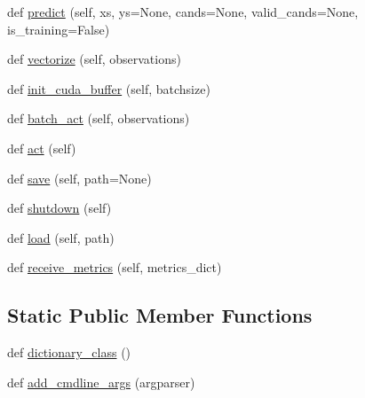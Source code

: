 \begin{DoxyCompactItemize}
\item 
def \hyperlink{classparlai_1_1agents_1_1legacy__agents_1_1seq2seq_1_1seq2seq__v0_1_1Seq2seqAgent_aadec879f7d8daa6451076e4fb358715b}{predict} (self, xs, ys=None, cands=None, valid\+\_\+cands=None, is\+\_\+training=False)
\item 
def \hyperlink{classparlai_1_1agents_1_1legacy__agents_1_1seq2seq_1_1seq2seq__v0_1_1Seq2seqAgent_a83e2433e00bff6162ebad3b818771b59}{vectorize} (self, observations)
\item 
def \hyperlink{classparlai_1_1agents_1_1legacy__agents_1_1seq2seq_1_1seq2seq__v0_1_1Seq2seqAgent_a9326d8ed88999a992b8ec73313c70a36}{init\+\_\+cuda\+\_\+buffer} (self, batchsize)
\item 
def \hyperlink{classparlai_1_1agents_1_1legacy__agents_1_1seq2seq_1_1seq2seq__v0_1_1Seq2seqAgent_a4ae534e440fd57603bc9b6e7c08b1c57}{batch\+\_\+act} (self, observations)
\item 
def \hyperlink{classparlai_1_1agents_1_1legacy__agents_1_1seq2seq_1_1seq2seq__v0_1_1Seq2seqAgent_ae66e8065addb136eb82828ccbe56c5ca}{act} (self)
\item 
def \hyperlink{classparlai_1_1agents_1_1legacy__agents_1_1seq2seq_1_1seq2seq__v0_1_1Seq2seqAgent_a31c017cd07b01834a5d467fadfddd7cd}{save} (self, path=None)
\item 
def \hyperlink{classparlai_1_1agents_1_1legacy__agents_1_1seq2seq_1_1seq2seq__v0_1_1Seq2seqAgent_a86c41e705170f0b2e56a5bbc378aead9}{shutdown} (self)
\item 
def \hyperlink{classparlai_1_1agents_1_1legacy__agents_1_1seq2seq_1_1seq2seq__v0_1_1Seq2seqAgent_a2aabe1e56b7b94f46875ae7f704f681f}{load} (self, path)
\item 
def \hyperlink{classparlai_1_1agents_1_1legacy__agents_1_1seq2seq_1_1seq2seq__v0_1_1Seq2seqAgent_a584d45d729817694d615d2d545532af2}{receive\+\_\+metrics} (self, metrics\+\_\+dict)
\end{DoxyCompactItemize}
\subsection*{Static Public Member Functions}
\begin{DoxyCompactItemize}
\item 
def \hyperlink{classparlai_1_1agents_1_1legacy__agents_1_1seq2seq_1_1seq2seq__v0_1_1Seq2seqAgent_a05552a2714cd8d15d754a62258727c98}{dictionary\+\_\+class} ()
\item 
def \hyperlink{classparlai_1_1agents_1_1legacy__agents_1_1seq2seq_1_1seq2seq__v0_1_1Seq2seqAgent_ac00637641bf7d8f23614c53ec8a1c610}{add\+\_\+cmdline\+\_\+args} (argparser)
\end{DoxyCompactItemize}
